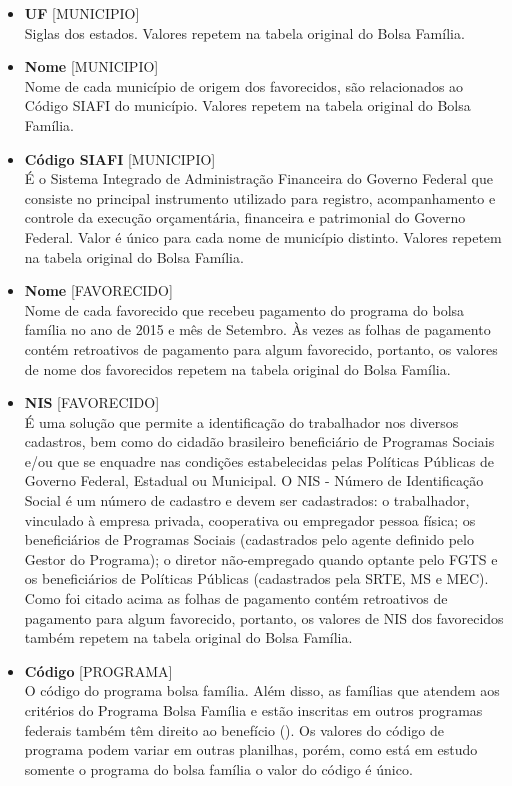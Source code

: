 \documentclass[12pt]{article}
\begin{document}
	\begin{itemize}
		\item \textbf{UF} [MUNICIPIO] \\ Siglas dos estados. Valores repetem na tabela original do Bolsa Família.
		\item \textbf{Nome} [MUNICIPIO] \\ Nome de cada município de origem dos favorecidos, são relacionados ao Código SIAFI do município. Valores repetem na tabela original do Bolsa Família.
		\item \textbf{Código SIAFI} [MUNICIPIO] \\  É o Sistema Integrado de Administração Financeira do Governo Federal que consiste no principal instrumento utilizado para registro, acompanhamento e controle da execução orçamentária, financeira e patrimonial do Governo Federal. Valor é único para cada nome de município distinto. Valores repetem na tabela original do Bolsa Família.
		\item \textbf{Nome} [FAVORECIDO] \\ Nome de cada favorecido que recebeu pagamento do programa do bolsa família no ano de 2015 e mês de Setembro. Às vezes as folhas de pagamento contém retroativos de pagamento para algum favorecido, portanto, os valores de nome dos favorecidos repetem na tabela original do Bolsa Família.
		\item \textbf{NIS} [FAVORECIDO] \\ É uma solução que permite a identificação do trabalhador nos diversos cadastros, bem como do cidadão brasileiro beneficiário de Programas Sociais e/ou que se enquadre nas condições estabelecidas pelas Políticas Públicas de Governo Federal, Estadual ou Municipal. O NIS - Número de Identificação Social é um número de cadastro e devem ser cadastrados: o trabalhador, vinculado à empresa privada, cooperativa ou empregador pessoa física; os beneficiários de Programas Sociais (cadastrados pelo agente definido pelo Gestor do Programa); o diretor não-empregado quando optante pelo FGTS e os beneficiários de Políticas Públicas (cadastrados pela SRTE, MS e MEC). Como foi citado acima as folhas de pagamento contém retroativos de pagamento para algum favorecido, portanto, os valores de NIS dos favorecidos também repetem na tabela original do Bolsa Família.
		\item \textbf{Código} [PROGRAMA] \\  O código do programa bolsa família. Além disso, as famílias que atendem aos critérios do Programa Bolsa Família e estão inscritas em outros programas federais também têm direito ao benefício (\cite{caixa}). Os valores do código de programa podem variar em outras planilhas, porém, como está em estudo somente o programa do bolsa família o valor do código é único.

\end{itemize}
\end{document}
